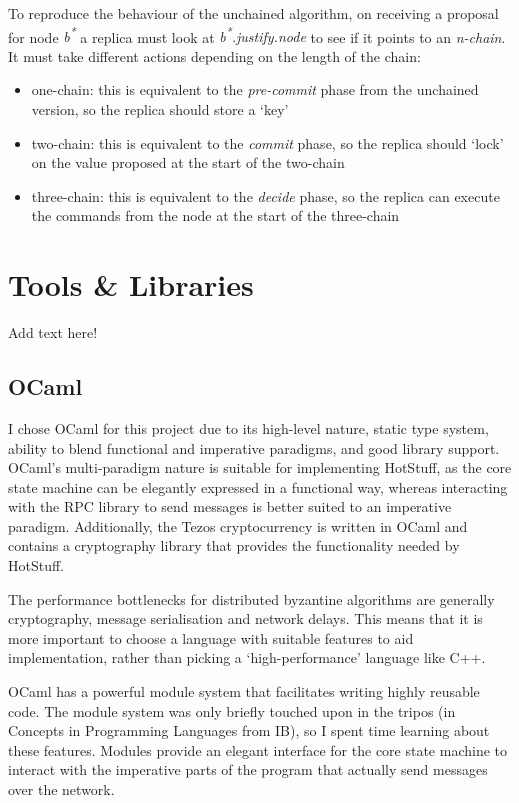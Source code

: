 To reproduce the behaviour of the unchained algorithm, on receiving a proposal for node \textit{b\textsuperscript{*}} a replica must look at \textit{b\textsuperscript{*}.justify.node} to see if it points to an \textit{n-chain}. It must take different actions depending on the length of the chain:

\begin{itemize}
\item one-chain: this is equivalent to the \textit{pre-commit} phase from the unchained version, so the replica should store a `key'
\item two-chain: this is equivalent to the \textit{commit} phase, so the replica should `lock' on the value proposed at the start of the two-chain
\item three-chain: this is equivalent to the \textit{decide} phase, so the replica can execute the commands from the node at the start of the three-chain
\end{itemize}

\section{Tools \& Libraries}
Add text here!

\subsection{OCaml}
I chose OCaml for this project due to its high-level nature, static type system, ability to blend functional and imperative paradigms, and good library support. OCaml's multi-paradigm nature is suitable for implementing HotStuff, as the core state machine can be elegantly expressed in a functional way, whereas interacting with the RPC library to send messages is better suited to an imperative paradigm. Additionally, the Tezos cryptocurrency is written in OCaml and contains a cryptography library that provides the functionality needed by HotStuff.

The performance bottlenecks for distributed byzantine algorithms are generally cryptography, message serialisation and network delays. This means that it is more important to choose a language with suitable features to aid implementation, rather than picking a `high-performance' language like C++.

OCaml has a powerful module system that facilitates writing highly reusable code. The module system was only briefly touched upon in the tripos (in Concepts in Programming Languages from IB), so I spent time learning about these features. Modules provide an elegant interface for the core state machine to interact with the imperative parts of the program that actually send messages over the network.

